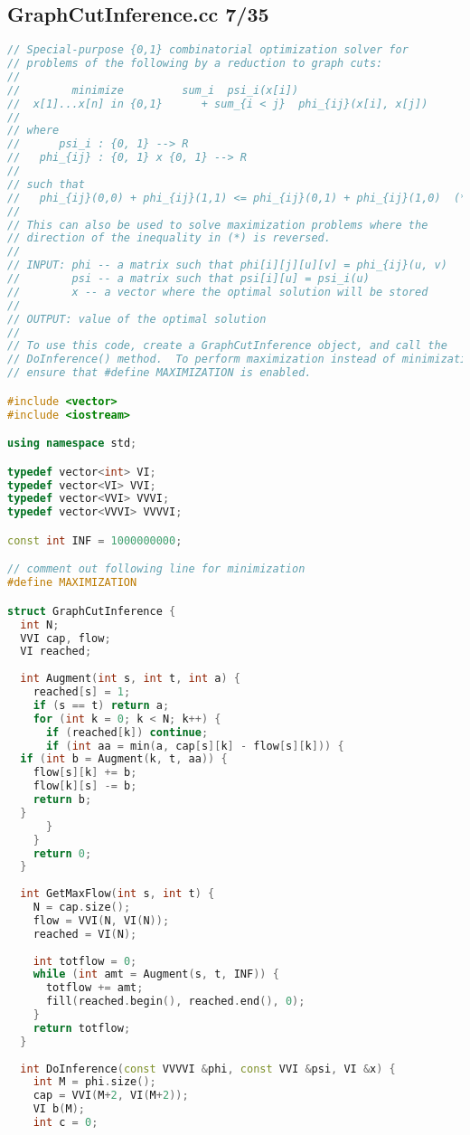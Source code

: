 \subsection{GraphCutInference.cc 7/35}
\begin{lstlisting}[language=C++]
// Special-purpose {0,1} combinatorial optimization solver for
// problems of the following by a reduction to graph cuts:
//
//        minimize         sum_i  psi_i(x[i]) 
//  x[1]...x[n] in {0,1}      + sum_{i < j}  phi_{ij}(x[i], x[j])
//
// where
//      psi_i : {0, 1} --> R
//   phi_{ij} : {0, 1} x {0, 1} --> R
//
// such that
//   phi_{ij}(0,0) + phi_{ij}(1,1) <= phi_{ij}(0,1) + phi_{ij}(1,0)  (*)
//
// This can also be used to solve maximization problems where the
// direction of the inequality in (*) is reversed.
//
// INPUT: phi -- a matrix such that phi[i][j][u][v] = phi_{ij}(u, v)
//        psi -- a matrix such that psi[i][u] = psi_i(u)
//        x -- a vector where the optimal solution will be stored
//
// OUTPUT: value of the optimal solution
//
// To use this code, create a GraphCutInference object, and call the
// DoInference() method.  To perform maximization instead of minimization,
// ensure that #define MAXIMIZATION is enabled.

#include <vector>
#include <iostream>

using namespace std;

typedef vector<int> VI;
typedef vector<VI> VVI;
typedef vector<VVI> VVVI;
typedef vector<VVVI> VVVVI;

const int INF = 1000000000;

// comment out following line for minimization
#define MAXIMIZATION

struct GraphCutInference {
  int N;
  VVI cap, flow;
  VI reached;
  
  int Augment(int s, int t, int a) {
    reached[s] = 1;
    if (s == t) return a; 
    for (int k = 0; k < N; k++) {
      if (reached[k]) continue;
      if (int aa = min(a, cap[s][k] - flow[s][k])) {
  if (int b = Augment(k, t, aa)) {
    flow[s][k] += b;
    flow[k][s] -= b;
    return b;
  }
      }
    }
    return 0;
  }
  
  int GetMaxFlow(int s, int t) {
    N = cap.size();
    flow = VVI(N, VI(N));
    reached = VI(N);
    
    int totflow = 0;
    while (int amt = Augment(s, t, INF)) {
      totflow += amt;
      fill(reached.begin(), reached.end(), 0);
    }
    return totflow;
  }
  
  int DoInference(const VVVVI &phi, const VVI &psi, VI &x) {
    int M = phi.size();
    cap = VVI(M+2, VI(M+2));
    VI b(M);
    int c = 0;


\end{lstlisting}
